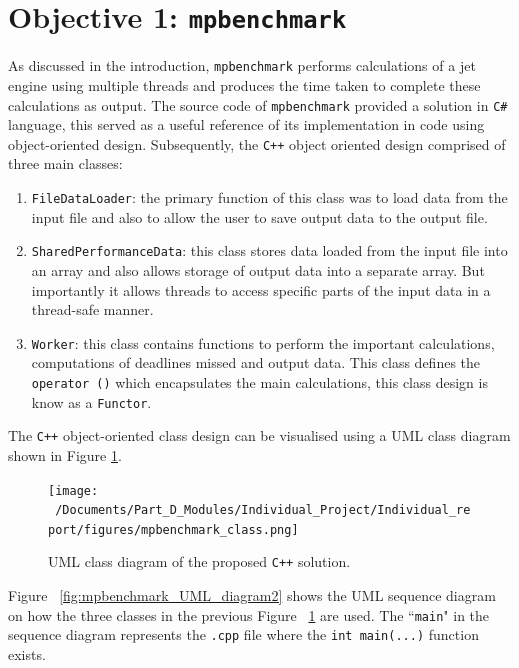 \section{Objective 1: \texttt{mpbenchmark}}
As discussed in the introduction, \texttt{mpbenchmark} performs calculations of a jet engine using multiple threads and produces the time taken to complete these calculations as output. The source code of \texttt{mpbenchmark} provided a solution in \texttt{C\#} language\cite{mpbenchmark_code}, this served as a useful reference of its implementation in code using object-oriented design. Subsequently, the \texttt{C++} object oriented design comprised of three main classes:

\begin{enumerate}
	\item \texttt{FileDataLoader}: the primary function of this class was to load data from the input file and also to allow the user to save output data to the output file.
	\item \texttt{SharedPerformanceData}: this class stores data loaded from the input file into an array and also allows storage of output data into a separate array. But importantly it allows threads to access specific parts of the input data in a thread-safe manner. 
	\item \texttt{Worker}: this class contains functions to perform the important calculations, computations of deadlines missed and output data. This class defines the \texttt{operator ()} which encapsulates the main calculations, this class design is know as a \texttt{Functor}.
\end{enumerate}

The \texttt{C++} object-oriented class design can be visualised using a UML class diagram shown in Figure \ref{fig:mpbenchmark_UML_diagram}.

\begin{figure}[H] %
	\centering
	\texttt{[image: ~/Documents/Part\_D\_Modules/Individual\_Project/Individual\_report/figures/mpbenchmark\_class.png]} %
	\caption{UML class diagram of the proposed \texttt{C++} solution.}
	\label{fig:mpbenchmark_UML_diagram} %
\end{figure}

Figure ~\ref{fig:mpbenchmark_UML_diagram2} shows the UML sequence diagram on how the three classes in the previous Figure ~\ref{fig:mpbenchmark_UML_diagram} are used. The ``\texttt{main}" in the sequence diagram represents the \texttt{.cpp} file where the \texttt{int main(...)} function exists. 

